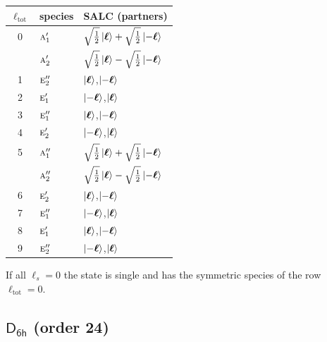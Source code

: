 \documentclass[11pt]{article}
\newcommand{\grp}[1]{\mathsf{#1}}
\newcommand{\irr}[1]{\text{\normalfont\scshape #1}}
\begin{document}
\begin{longtable}{c l l}\hline $\ell_{\mathrm{tot}}$ & species & SALC (partners)\\ \hline\endhead

0 & $\irr{a}_{1}'$ & $\sqrt{\tfrac{1}{2}}\ket{\boldsymbol\ell}+\sqrt{\tfrac{1}{2}}\ket{-\boldsymbol\ell}$\\

 & $\irr{a}_{2}'$ & $\sqrt{\tfrac{1}{2}}\ket{\boldsymbol\ell}-\sqrt{\tfrac{1}{2}}\ket{-\boldsymbol\ell}$\\

1 & $\irr{e}_{2}''$ & $\ket{\boldsymbol\ell}$,\quad $\ket{-\boldsymbol\ell}$\\

2 & $\irr{e}_{1}'$ & $\ket{-\boldsymbol\ell}$,\quad $\ket{\boldsymbol\ell}$\\

3 & $\irr{e}_{1}''$ & $\ket{\boldsymbol\ell}$,\quad $\ket{-\boldsymbol\ell}$\\

4 & $\irr{e}_{2}'$ & $\ket{-\boldsymbol\ell}$,\quad $\ket{\boldsymbol\ell}$\\

5 & $\irr{a}_{1}''$ & $\sqrt{\tfrac{1}{2}}\ket{\boldsymbol\ell}+\sqrt{\tfrac{1}{2}}\ket{-\boldsymbol\ell}$\\

 & $\irr{a}_{2}''$ & $\sqrt{\tfrac{1}{2}}\ket{\boldsymbol\ell}-\sqrt{\tfrac{1}{2}}\ket{-\boldsymbol\ell}$\\

6 & $\irr{e}_{2}'$ & $\ket{\boldsymbol\ell}$,\quad $\ket{-\boldsymbol\ell}$\\

7 & $\irr{e}_{1}''$ & $\ket{-\boldsymbol\ell}$,\quad $\ket{\boldsymbol\ell}$\\

8 & $\irr{e}_{1}'$ & $\ket{\boldsymbol\ell}$,\quad $\ket{-\boldsymbol\ell}$\\

9 & $\irr{e}_{2}''$ & $\ket{-\boldsymbol\ell}$,\quad $\ket{\boldsymbol\ell}$\\

\hline\end{longtable}

If all $\ell_s=0$ the state is single and has the symmetric species of the row $\ell_{\mathrm{tot}}=0$.

\subsection*{$\grp{D_{6h}}$ \quad (order 24)}
\end{document}
